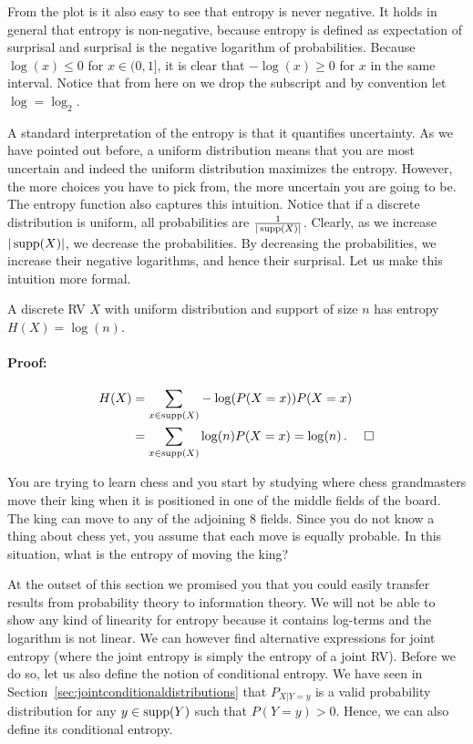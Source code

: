 From the plot is it also easy to see that entropy is never negative. It holds in general that entropy is non-negative,
because entropy is defined as expectation of surprisal and surprisal is the negative logarithm of probabilities. 
Because $ \log(x) \leq 0 $ for $ x \in (0,1] $, it is clear that $ -\log(x) \geq 0 $ for $ x $ in the same
interval. Notice that from here on we drop the subscript and by convention let $ \log = \log_{2} $.

A standard interpretation of the entropy is that it quantifies uncertainty. As we have pointed out
before, a uniform distribution means that you are most uncertain and
indeed the uniform distribution maximizes the entropy. However, the more choices you have to pick from, the more uncertain you are going to be. 
The entropy function also captures this intuition. Notice that if a discrete distribution is uniform,
all probabilities are $ \frac{1}{|\operatorname{supp}(X)|} $. Clearly, as we increase $ |\operatorname{supp}(X)| $, we decrease the
probabilities. By decreasing the probabilities, we increase their negative logarithms, and hence their
surprisal. Let us make this intuition more formal.

\begin{Theorem}
A discrete RV $ X $ with uniform distribution and support of size $ n $ has entropy
$ H(X) = \log(n) $.
\end{Theorem}

\paragraph{Proof:}
\begin{align}
H(X) &= \underset{x \in \operatorname{supp}(X)}{\sum}-\log(P(X=x))P(X=x) \\
&= \underset{x \in \operatorname{supp}(X)}{\sum}\log(n)P(X=x) = \log(n) \, . ~~~~\square
\end{align}

\begin{Exercise}
You are trying to learn chess and you start by studying where chess grandmasters move their king when it
is positioned in one of the middle fields of the board. The king can move to any of the adjoining 8 fields. Since
you do not know a thing about chess yet, you assume that each move is equally probable. In this situation,
what is the entropy of moving the king?
\end{Exercise}

At the outset of this section we promised you that you could easily transfer results from probability 
theory to information theory. We will not be able to show any kind of linearity for entropy because it contains
log-terms and the logarithm is not linear. We can however find alternative expressions for joint entropy (where 
the joint entropy is simply the entropy of a joint RV). Before we do so, let us also define the notion of 
conditional entropy. We have seen in Section~\ref{sec:jointconditionaldistributions} that $P_{X|Y=y}$ is a valid probability distribution for any $y \in \operatorname{supp}(Y)$ such that $P(Y=y)>0$. Hence, we can also define its conditional entropy.

